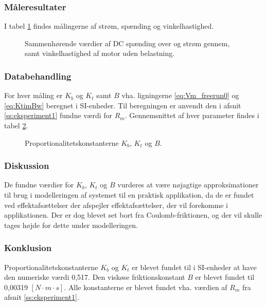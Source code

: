 \subsubsection{Måleresultater}
I tabel \ref{tb:steadystatenoload} findes målingerne af strøm, spænding og vinkelhastighed.
\begin{figure}[th!]
	\centering
	
	\captionsetup{type=table}
	\caption[Steady-state spænding, strøm og vinkelhastighed uden belastning]
			{Sammenhørende værdier af DC spænding over og strøm gennem, samt vinkelhastighed af motor uden belastning.}
	\label{tb:steadystatenoload}
\end{figure}
\subsubsection{Databehandling}
For hver måling er \(K_b\) og \(K_t\) samt \(B\) vha. ligningerne \ref{eq:Vm_freerun0} og \ref{eq:KtimBw} beregnet
i SI-enheder. Til beregningen er anvendt den i afsnit \ref{ss:eksperiment1} fundne værdi for \(R_m\).
Gennemsnittet af hver parameter findes i tabel \ref{tb:kbktb}.
\begin{figure}[th!]
	\centering
	
	\captionsetup{type=table}

	\caption[Proportionalitetskonstanterne]
			{Proportionalitetskonstanterne \(K_b\), \(K_t\) og \(B\).}
	\label{tb:kbktb}
\end{figure}

\subsubsection{Diskussion}
De fundne værdier for \(K_b\), \(K_t\) og \(B\) vurderes at være nøjagtige approksimationer
til brug i modelleringen af systemet til en praktisk applikation, da de er fundet ved effektafsættelser
der afspejler effektafsættelser, der vil forekomme i applikationen.
Der er dog blevet set bort fra Coulomb-friktionen, og der vil skulle tages højde for dette under modelleringen.
\subsubsection{Konklusion}
Proportionalitetskonstanterne \(K_b\) og \(K_t\) er blevet fundet til i SI-enheder at have den numeriske værdi 0,517.
Den viskøse friktionskonstant \(B\) er blevet fundet til 0,00319 \([N \cdot m \cdot s]\).
Alle konstanterne er blevet fundet vha. værdien af \(R_m\) fra afsnit \ref{ss:eksperiment1}.
